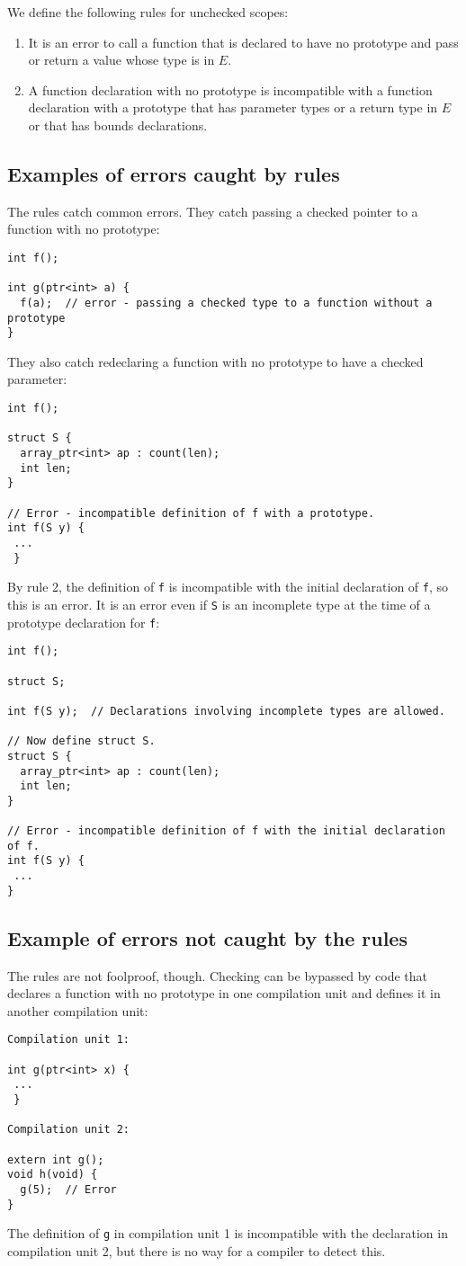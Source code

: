 We define the following rules for unchecked scopes:
\begin{enumerate}
\item It is an error to call a function that is
declared to have no prototype and pass or return a value whose type is in $E$.
\item A function declaration with no prototype is incompatible with a function declaration
with a prototype that has parameter types or a return type in $E$ or that has bounds
declarations.
\end{enumerate}

\subsection{Examples of errors caught by rules}
The rules catch common errors.  They catch passing a checked pointer
to a function with no prototype:
\begin{lstlisting}
int f();

int g(ptr<int> a) {
  f(a);  // error - passing a checked type to a function without a prototype
}
\end{lstlisting}
They also catch redeclaring a function with no prototype to have a checked parameter:
\begin{lstlisting}
int f();

struct S {
  array_ptr<int> ap : count(len);
  int len;
}

// Error - incompatible definition of f with a prototype.
int f(S y) {
 ...
 }
\end{lstlisting}
By rule 2, the definition of \verb+f+ is incompatible with the initial
declaration of \verb+f+, so this is an error.  It is an error even
if \verb+S+ is an incomplete type at the time of
a prototype declaration for \verb+f+:
\begin{lstlisting} 
int f();

struct S;

int f(S y);  // Declarations involving incomplete types are allowed.

// Now define struct S.
struct S {
  array_ptr<int> ap : count(len);
  int len;
}

// Error - incompatible definition of f with the initial declaration of f.
int f(S y) {
 ...
}
\end{lstlisting}

\subsection{Example of errors not caught by the rules}
The rules are not foolproof, though. Checking can be bypassed by code that
declares a function with no prototype in one
compilation unit and defines it in another compilation unit:
\begin{lstlisting}
Compilation unit 1:

int g(ptr<int> x) {
 ...
 }

Compilation unit 2:

extern int g();
void h(void) {
  g(5);  // Error
}
\end{lstlisting}
The definition of \verb+g+ in compilation unit 1 is incompatible with
the declaration in compilation unit 2, but there is no way for a compiler
to detect this.

